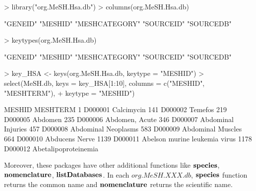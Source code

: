 \documentclass[11pt]{article}
\begin{document}
\begin{center}
\begin{Schunk}
\begin{Sinput}
> library("org.MeSH.Hsa.db")
> columns(org.MeSH.Hsa.db)
\end{Sinput}
\begin{Soutput}
[1] "GENEID"       "MESHID"       "MESHCATEGORY" "SOURCEID"     "SOURCEDB"    
\end{Soutput}
\begin{Sinput}
> keytypes(org.MeSH.Hsa.db)
\end{Sinput}
\begin{Soutput}
[1] "GENEID"       "MESHID"       "MESHCATEGORY" "SOURCEID"     "SOURCEDB"    
\end{Soutput}
\begin{Sinput}
> key_HSA <- keys(org.MeSH.Hsa.db, keytype = "MESHID")
> select(MeSH.db, keys = key_HSA[1:10], columns = c("MESHID", "MESHTERM"), 
+     keytype = "MESHID")
\end{Sinput}
\begin{Soutput}
      MESHID                      MESHTERM
1    D000001                    Calcimycin
141  D000002                       Temefos
219  D000005                       Abdomen
235  D000006                Abdomen, Acute
346  D000007            Abdominal Injuries
457  D000008           Abdominal Neoplasms
583  D000009             Abdominal Muscles
664  D000010                Abducens Nerve
1139 D000011 Abelson murine leukemia virus
1178 D000012          Abetalipoproteinemia
\end{Soutput}
\end{Schunk}
\end{center}
Moreover, these packages have other additional functions like $\bf{species}$, $\bf{nomenclature}$, $\bf{listDatabases}$.
In each $org.MeSH.XXX.db$, $\bf{species}$ function returns the common name and $\bf{nomenclature}$ returns the scientific name.
\end{document}
